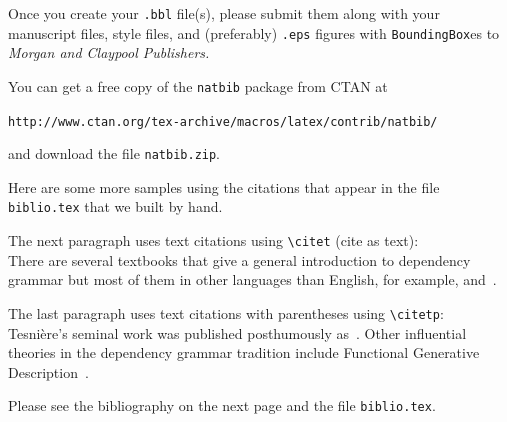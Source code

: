 \documentclass{book}\usepackage[]{graphicx}\usepackage[]{color}
\begin{document}
Once you create your \verb+.bbl+ file(s), please submit them along with
your manuscript files, style files, and (preferably) \verb+.eps+ figures with 
\verb+BoundingBox+es to \textit{Morgan and Claypool Publishers.}

You can get a free copy of the \verb+natbib+ package  from CTAN at
\begin{center}
\verb+http://www.ctan.org/tex-archive/macros/latex/contrib/natbib/+
\end{center}
and download the file \verb+natbib.zip+.

Here are some more samples using the citations that appear in the file
\verb+biblio.tex+ that we built by hand.

The next paragraph uses text citations using \verb+\citet+ (cite as text):\\
\noindent
There are several textbooks that give a general 
introduction to dependency grammar but
most of them in other languages than English, for example,
\citet{tarvainen82} and~\citet{weber-97}.

The last paragraph uses text citations with parentheses
using \verb+\citetp+:\\
\noindent
Tesni{\`e}re's seminal work was published
posthumously as~\citep{tesniere59}. 
Other influential theories in the dependency
grammar tradition include Functional Generative
Description~\citep{SHP:1986}.

Please see the bibliography on the next page and the file \verb+biblio.tex+.

\clearpage



 \backmatter                    %

\end{document}

